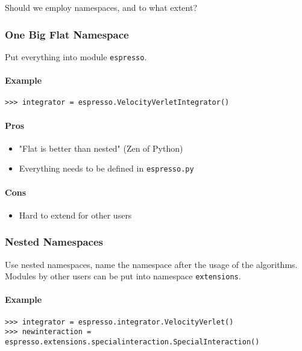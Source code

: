 \documentclass[
a4paper,                        %
11pt,                           %
]{scrartcl}
\begin{document}
Should we employ namespaces, and to what extent?

\subsubsection{One Big Flat Namespace}

Put everything into module \texttt{espresso}.

\paragraph{Example}
\begin{verbatim}
>>> integrator = espresso.VelocityVerletIntegrator()
\end{verbatim}

\paragraph{Pros}
\begin{itemize}
\item "Flat is better than nested" (Zen of Python)
\item Everything needs to be defined in \texttt{espresso.py}
\end{itemize}

\paragraph{Cons}
\begin{itemize}
\item Hard to extend for other users
\end{itemize}

\subsubsection{Nested Namespaces}

Use nested namespaces, name the namespace after the usage of the
algorithms. Modules by other users can be put into namespace
\texttt{extensions}.

\paragraph{Example}
\begin{verbatim}
>>> integrator = espresso.integrator.VelocityVerlet()
>>> newinteraction = espresso.extensions.specialinteraction.SpecialInteraction()
\end{verbatim}
\end{document}
